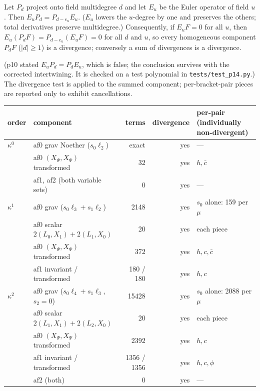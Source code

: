 \begin{lemma}
Let $P_d$ project onto field multidegree $d$ and let $E_u$ be the Euler operator of field $u$. Then
$E_uP_d=P_{d-e_u}E_u$. ($E_u$ lowers the $u$-degree by one and preserves the others; total derivatives preserve
multidegree.) Consequently, if $E_uF=0$ for all $u$, then $E_u(P_dF)=P_{d-e_u}(E_uF)=0$ for all $d$ and $u$, so every
homogeneous component $P_dF$ ($|d|\ge1$) is a divergence; conversely a sum of divergences is a divergence.
\end{lemma}
\noindent (p10 stated $E_uP_d=P_dE_u$, which is false; the conclusion survives with the corrected intertwining. It is
checked on a test polynomial in \texttt{tests/test\_p14.py}.) The divergence test is applied to the summed component;
per-bracket-pair pieces are reported only to exhibit cancellations.

\begin{center}\small
\begin{tabular}{llrrl}
\toprule
order & component & terms & divergence & per-pair (individually non-divergent)\\
\midrule
$\kappa^0$ & af0 grav Noether ($s_0\ell_2$) & exact & yes & --- \\
 & af0 $(X_\Psi,X_\Psi)$ transformed & 32 & yes & $h,\bar c$ \\
 & af1, af2 (both variable sets) & 0 & yes & --- \\
$\kappa^1$ & af0 grav ($s_0\ell_3+s_1\ell_2$) & 2148 & yes & $s_0$ alone: 159 per $\mu$ \\
 & af0 scalar $2(L_0,X_1)+2(L_1,X_0)$ & 20 & yes & each piece \\
 & af0 $(X_\Psi,X_\Psi)$ transformed & 372 & yes & $h,c,\bar c$\\
 & af1 invariant / transformed & 180 / 180 & yes & $h,c$\\
$\kappa^2$ & af0 grav ($s_0\ell_4+s_1\ell_3$, $s_2=0$) & 15428 & yes & $s_0$ alone: 2088 per $\mu$ \\
 & af0 scalar $2(L_1,X_1)+2(L_2,X_0)$ & 20 & yes & each piece \\
 & af0 $(X_\Psi,X_\Psi)$ transformed & 2392 & yes & $h,c$\\
 & af1 invariant / transformed & 1356 / 1356 & yes & $h,c,\phi$\\
 & af2 (both) & 0 & yes & ---\\
\bottomrule
\end{tabular}
\end{center}

